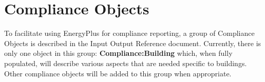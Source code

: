 \section{Compliance Objects}\label{compliance-objects}

To facilitate using EnergyPlus for compliance reporting, a group of Compliance Objects is described in the Input Output Reference document. Currently, there is only one object in this group: \textbf{Compliance:Building} which, when fully populated, will describe various aspects that are needed specific to buildings. Other compliance objects will be added to this group when appropriate.
